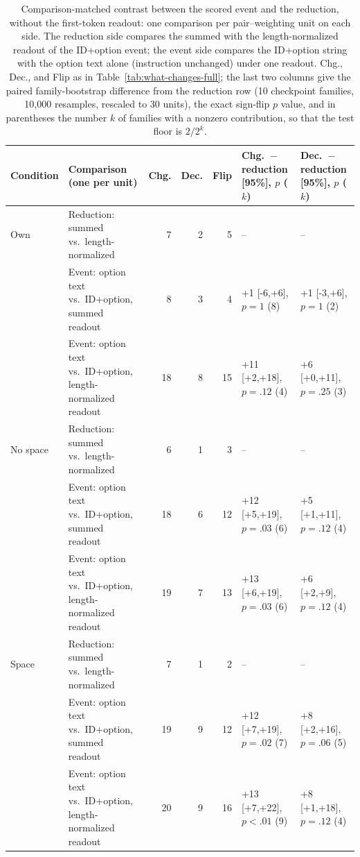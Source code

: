 \begin{table}[t]
\centering\scriptsize
\setlength{\tabcolsep}{2.4pt}
\begin{tabular}{@{}llrrrll@{}}
\toprule
Condition & Comparison (one per unit) & Chg. & Dec. & Flip & Chg.\ $-$ reduction [95\%], $p$ ($k$) & Dec.\ $-$ reduction [95\%], $p$ ($k$) \\
\midrule
Own & Reduction: summed vs.\ length-normalized & 7 & 2 & 5 & -- & -- \\
 & Event: option text vs.\ ID+option, summed readout & 8 & 3 & 4 & +1 [-6,+6], $p=1$ (8) & +1 [-3,+6], $p=1$ (2) \\
 & Event: option text vs.\ ID+option, length-normalized readout & 18 & 8 & 15 & +11 [+2,+18], $p=.12$ (4) & +6 [+0,+11], $p=.25$ (3) \\
\addlinespace[2pt]
No space & Reduction: summed vs.\ length-normalized & 6 & 1 & 3 & -- & -- \\
 & Event: option text vs.\ ID+option, summed readout & 18 & 6 & 12 & +12 [+5,+19], $p=.03$ (6) & +5 [+1,+11], $p=.12$ (4) \\
 & Event: option text vs.\ ID+option, length-normalized readout & 19 & 7 & 13 & +13 [+6,+19], $p=.03$ (6) & +6 [+2,+9], $p=.12$ (4) \\
\addlinespace[2pt]
Space & Reduction: summed vs.\ length-normalized & 7 & 1 & 2 & -- & -- \\
 & Event: option text vs.\ ID+option, summed readout & 19 & 9 & 12 & +12 [+7,+19], $p=.02$ (7) & +8 [+2,+16], $p=.06$ (5) \\
 & Event: option text vs.\ ID+option, length-normalized readout & 20 & 9 & 16 & +13 [+7,+22], $p<.01$ (9) & +8 [+1,+18], $p=.12$ (4) \\
\bottomrule
\end{tabular}
\caption{Comparison-matched contrast between the scored event and the reduction, without the first-token readout: one comparison per pair--weighting unit on each side. The reduction side compares the summed with the length-normalized readout of the ID+option event; the event side compares the ID+option string with the option text alone (instruction unchanged) under one readout. Chg., Dec., and Flip as in Table~\ref{tab:what-changes-full}; the last two columns give the paired family-bootstrap difference from the reduction row (10 checkpoint families, 10,000 resamples, rescaled to 30 units), the exact sign-flip $p$ value, and in parentheses the number $k$ of families with a nonzero contribution, so that the test floor is $2/2^k$.}
\label{tab:matched-contrast}
\end{table}
